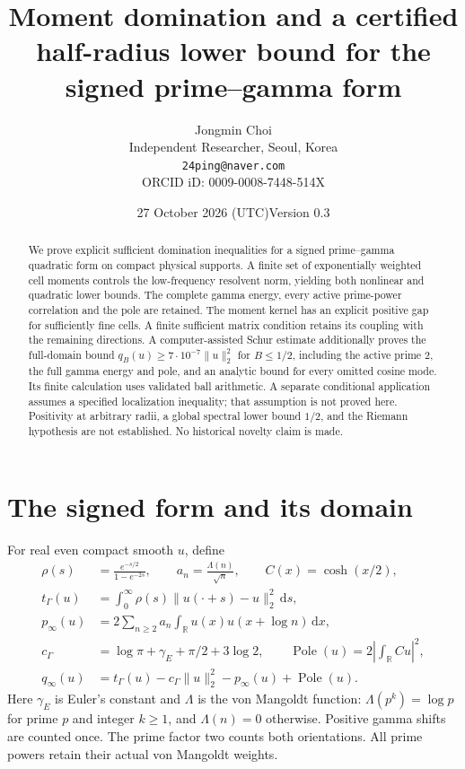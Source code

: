 \documentclass[11pt]{article}
\title{Moment domination and a certified half-radius lower bound for the signed prime--gamma form}
\author{Jongmin Choi\\
Independent Researcher, Seoul, Korea\\
\texttt{24ping@naver.com}\\
ORCID iD: 0009-0008-7448-514X}
\date{27 October 2026 (UTC)\quad Version 0.3}
\newcommand{\R}{\mathbb R}
\newcommand{\dd}{\,\mathrm d}
\newcommand{\norm}[1]{\lVert#1\rVert}
\newcommand{\Pole}{\operatorname{Pole}}
\begin{document}
\maketitle
\begin{abstract}
We prove explicit sufficient domination inequalities for a signed
prime--gamma quadratic form on compact physical supports. A finite set
of exponentially weighted cell moments controls the low-frequency
resolvent norm, yielding both nonlinear and quadratic lower bounds.
The complete gamma energy, every active prime-power correlation and
the pole are retained. The moment kernel has an explicit positive gap
for sufficiently fine cells. A finite sufficient matrix condition
retains its coupling with the remaining directions. A computer-assisted Schur estimate additionally proves the full-domain
bound $q_B(u)\ge7\cdot10^{-7}\lVert u\rVert_2^2$ for $B\le1/2$,
including the active prime $2$, the full gamma energy and pole, and an
analytic bound for every omitted cosine mode. Its finite calculation
uses validated ball arithmetic. A separate conditional application
assumes a specified localization inequality;
that assumption is not proved here. Positivity at arbitrary radii, a global
spectral lower bound $1/2$, and the Riemann hypothesis are not established.
No historical novelty claim is made.
\end{abstract}

\section{The signed form and its domain}
For real even compact smooth $u$, define
\begin{align}
 \rho(s)&=\frac{e^{-s/2}}{1-e^{-2s}},\qquad
 a_n=\frac{\Lambda(n)}{\sqrt n},\qquad C(x)=\cosh(x/2),\nonumber\\
 t_\Gamma(u)&=\int_0^\infty\rho(s)\norm{u(\cdot+s)-u}_2^2\dd s,\nonumber\\
 p_\infty(u)&=2\sum_{n\ge2}a_n\int_\R u(x)u(x+\log n)\dd x,\nonumber\\
 c_\Gamma&=\log\pi+\gamma_E+\pi/2+3\log2,\qquad
 \Pole(u)=2\left|\int_\R Cu\right|^2,\nonumber\\
 q_\infty(u)&=t_\Gamma(u)-c_\Gamma\norm{u}_2^2-p_\infty(u)+\Pole(u).
 \label{eq:form}
\end{align}
Here $\gamma_E$ is Euler's constant and $\Lambda$ is the von Mangoldt
function: $\Lambda(p^k)=\log p$ for prime $p$ and integer $k\ge1$,
and $\Lambda(n)=0$ otherwise. Positive gamma shifts are counted once.
The prime factor two counts both orientations. All prime powers retain
their actual von Mangoldt weights.
\end{document}
